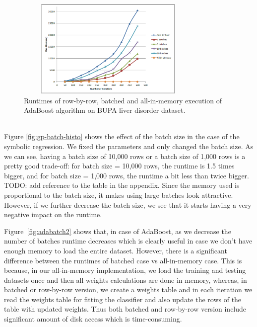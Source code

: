
\begin{figure}[ht]
\centering
\includegraphics[width=0.8\textwidth,height=180px]{ada2.png}
\caption{Runtimes of row-by-row, batched and all-in-memory execution of AdaBoost algorithm on BUPA liver disorder dataset.}
\label{fig:adabatch1}
\end{figure}

~~\\
Figure \ref{fig:gp-batch-histo} shows the effect of the batch size in the case of the symbolic regression. We fixed the parameters and only changed the batch size. As we can see, having a batch size of 10,000 rows or a batch size of 1,000 rows is a pretty good trade-off: for batch size = 10,000 rows, the runtime is 1.5  times bigger, and for batch size = 1,000 rows, the runtime a bit less than twice bigger. TODO: add reference to the table in the appendix. Since the memory used is proportional to the batch size, it makes using large batches look attractive. However, if we further decrease the batch size, we see that it starts having a very negative impact on the runtime. 

Figure~\ref{fig:adabatch2} shows that, in case of AdaBoost, as we decrease the number of batches runtime decreases which is clearly useful in case we don't have enough memory to load the entire dataset. However, there is a significant difference between the runtimes of batched case vs all-in-memory case. This is because, in our all-in-memory implementation, we load the training and testing datasets once and then all weights calculations are done in memory, whereas, in batched or row-by-row version, we create a weights table and in each iteration we read the weights table for fitting the classifier and also update the rows of the table with updated weights. Thus both batched and row-by-row version include significant amount of disk access which is time-consuming. 


